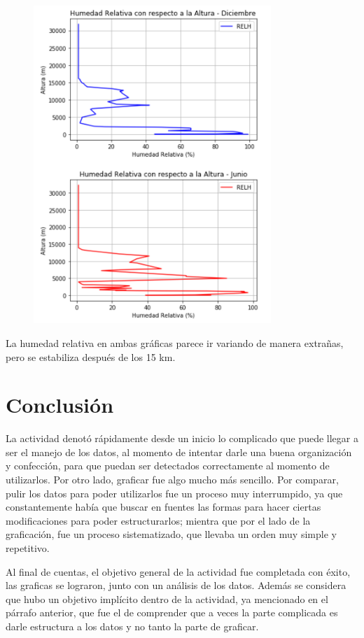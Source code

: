 \documentclass[a4paper]{article}
\begin{document}
\bigskip
 \begin{figure}[h!]
 \centering
  \includegraphics[width=0.8\textwidth]{Grafica5.PNG}
 \end{figure}
\bigskip

La humedad relativa en ambas gráficas parece ir variando de manera extrañas, pero se estabiliza después de los 15 km. 

\section{Conclusión}

La actividad denotó rápidamente desde un inicio lo complicado que puede llegar a ser el manejo de los datos, al momento de intentar darle una buena organización y confección, para que puedan ser detectados correctamente al momento de utilizarlos. Por otro lado, graficar fue algo mucho más sencillo. Por comparar, pulir los datos para poder utilizarlos fue un proceso muy interrumpido, ya que constantemente había que buscar en fuentes las formas para hacer ciertas modificaciones para poder estructurarlos; mientra que por el lado de la graficación, fue un proceso sistematizado, que llevaba un orden muy simple y repetitivo.   

Al final de cuentas, el objetivo general de la actividad fue completada con éxito, las graficas se lograron, junto con un análisis de los datos. Además se considera que hubo un objetivo implícito dentro de la actividad, ya mencionado en el párrafo anterior, que fue el de comprender que a veces la parte complicada es darle estructura a los datos y no tanto la parte de graficar. 
\end{document}
